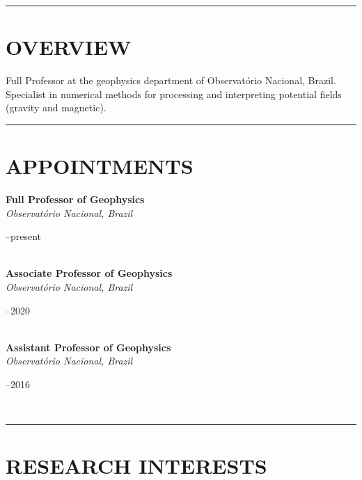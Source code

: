 \documentclass[11pt,a4paper,onecolumn]{article}
\begin{document}
\bigskip \hrule

\section*{OVERVIEW}

Full Professor at the geophysics department of Observat\'{o}rio Nacional, Brazil.
Specialist in numerical methods for processing and interpreting potential 
fields (gravity and magnetic).

\bigskip \hrule

\section*{APPOINTMENTS}

\noindent \textbf{Full Professor of Geophysics} \\
\noindent \textsl{Observat\'{o}rio Nacional, Brazil} \hfill \parbox{0.1\textwidth}{--present} \vspace{0.5\baselineskip} \\
\noindent \textbf{Associate Professor of Geophysics} \\
\noindent \textsl{Observat\'{o}rio Nacional, Brazil} \hfill \parbox{0.1\textwidth}{--2020} \vspace{0.5\baselineskip} \\
\noindent \textbf{Assistant Professor of Geophysics} \\
\noindent \textsl{Observat\'{o}rio Nacional, Brazil} \hfill \parbox{0.1\textwidth}{--2016} \vspace{0.5\baselineskip} \\

\bigskip \hrule

\section*{RESEARCH INTERESTS}
\end{document}
